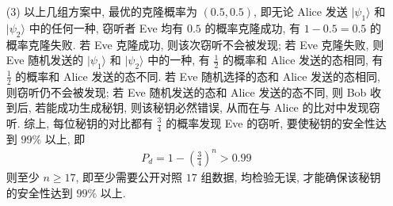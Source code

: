 \documentclass{assignment}
\begin{document}
\begin{sol}
\begin{itemize}
        \item[(3)] 以上几组方案中, 最优的克隆概率为 $(0.5,0.5)$, 即无论 Alice 发送 $\lvert\psi_1\rangle$ 和 $\lvert\psi_2\rangle$ 中的任何一种, 窃听者 Eve 均有 $0.5$ 的概率克隆成功, 有 $1-0.5=0.5$ 的概率克隆失败. 若 Eve 克隆成功, 则该次窃听不会被发现; 若 Eve 克隆失败, 则 Eve 随机发送的 $\lvert\psi_1\rangle$ 和 $\lvert\psi_2\rangle$ 中的一种, 有 $\frac{1}{2}$ 的概率和 Alice 发送的态相同, 有 $\frac{1}{2}$ 的概率和 Alice 发送的态不同. 若 Eve 随机选择的态和 Alice 发送的态相同, 则窃听仍不会被发现; 若 Eve 随机发送的态和 Alice 发送的态不同, 则 Bob 收到后, 若能成功生成秘钥, 则该秘钥必然错误, 从而在与 Alice 的比对中发现窃听. 综上, 每位秘钥的对比都有 $\frac{3}{4}$ 的概率发现 Eve 的窃听, 要使秘钥的安全性达到 $99\%$ 以上, 即
        \begin{align}
            P_d=1-\left(\frac{3}{4}\right)^n>0.99
        \end{align}
        则至少 $n\geq 17$, 即至少需要公开对照 $17$ 组数据, 均检验无误, 才能确保该秘钥的安全性达到 $99\%$ 以上.
    \end{itemize}
\end{sol}
\end{document}

